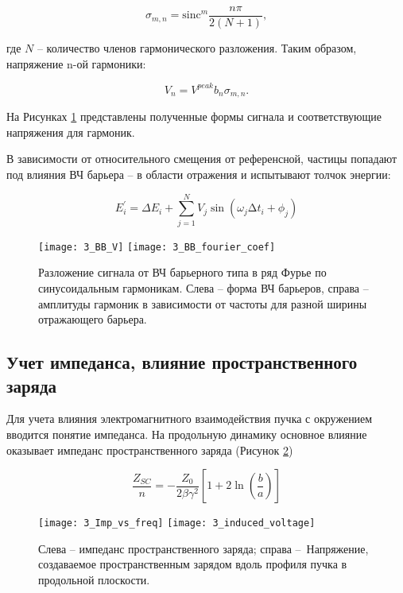 \begin{equation}
\sigma_{m, n}={\text{sinc}}^m{\frac{n\pi}{2\left(N+1\right)}},
\label{sigma}
\end{equation}

где $N$ – количество членов гармонического разложения. Таким образом, напряжение n-ой гармоники:

\begin{equation}
V_n=V^{peak}b_n\sigma_{m, n}.
\label{Volt_n}
\end{equation}

На Рисунках \ref{fig:wave} представлены полученные формы сигнала и со\-от\-вет\-ству\-ющ\-ие напряжения для гармоник.

В зависимости от относительного смещения от референсной, частицы попадают под влияния ВЧ барьера – в области отражения и испытывают толчок энергии:

\begin{equation}
E_i^\prime=\Delta E_i+\sum_{j=1}^{N} V_j\sin{\left(\omega_{j}\mathrm{\Delta}t_i+\phi_j\right)} 
\label{dE}
\end{equation}

\begin{figure}[!h]
   \texttt{[image: 3\_BB\_V]}
   \texttt{[image: 3\_BB\_fourier\_coef]}
   \caption{Разложение сигнала от ВЧ барьерного типа в ряд Фурье по синусоидальным гармоникам. Слева – форма 
   ВЧ барьеров, справа – амплитуды гармоник в зависимости от частоты для разной ширины отражающего барьера.}
   \label{fig:wave}
\end{figure}

\subsection{Учет импеданса, влияние пространственного заряда}\label{subsec:transition_jump/regular/SC}

\par Для учета влияния электромагнитного взаимодействия пучка с ок\-ру\-же\-ни\-ем вводится понятие импеданса. На продольную динамику основное влияние оказывает импеданс пространственного заряда \cite{laclare} (Рисунок \ref{fig:signal}) 

\begin{equation}
\frac{Z_{SC}}{n}=-\frac{Z_0}{2\beta\gamma^2}\left[1+2\ln{\left(\frac{b}{a}\right)}\right]
\label{sc}
\end{equation}

\begin{figure}[!h]
   \texttt{[image: 3\_Imp\_vs\_freq]}
   \texttt{[image: 3\_induced\_voltage]}
   \caption{Слева – импеданс пространственного заряда; справа – Напряжение, создаваемое пространственным 
   зарядом вдоль профиля пучка в продольной плоскости. }
   \label{fig:signal}
\end{figure}

